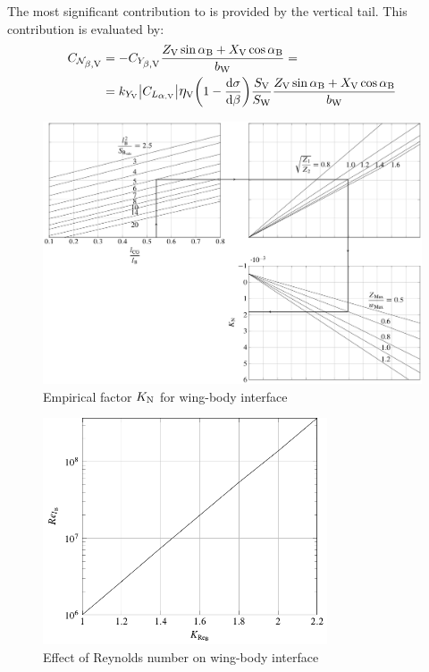 The most significant contribution to \CNbeta is provided by the vertical tail. This contribution is evaluated by:
\begin{equation}
\label{eq:weathercockVertical}
\begin{split}
\CNbetaV & = -\CYbetaV \frac{\ZV \sin\alphaB + \XV \cos\alphaB}{\bW} = \\
& = k_{Y_\textrm V} \big|\CLalphaV \big| \etaV \biggl( 1 - \frac{\mathrm{d}\sigma}{\mathrm{d}\beta} \biggr) \frac{\SV}{\SW} \frac{\ZV \sin\alphaB + \XV \cos\alphaB}{\bW}
\end{split}
\end{equation}

\begin{figure}[htbp]
\centering
\includegraphics[width=\textwidth]{Immagini/Capitolo2/4_68-KN}
\caption[Empirical factor $K_\text N$ for wing-body interface] {Empirical factor $K_\text N$ for wing-body interface}
\label{wingbodyinterface}
\end{figure}

\begin{figure}[htbp]
\centering
\includegraphics[width=0.75\textwidth]{Immagini/Capitolo2/4_69-KReB}
\caption[Effect of Reynolds number on wing-body interface] {Effect of Reynolds number on wing-body interface}
\label{reynoldscontribution}
\end{figure}

